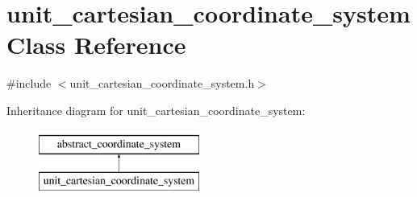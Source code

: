 \hypertarget{classunit__cartesian__coordinate__system}{\section{unit\-\_\-cartesian\-\_\-coordinate\-\_\-system Class Reference}
\label{classunit__cartesian__coordinate__system}
}


{\ttfamily \#include $<$unit\-\_\-cartesian\-\_\-coordinate\-\_\-system.\-h$>$}

Inheritance diagram for unit\-\_\-cartesian\-\_\-coordinate\-\_\-system\-:\begin{figure}[H]
\begin{center}
\leavevmode
\includegraphics[height=2.000000cm]{classunit__cartesian__coordinate__system}
\end{center}
\end{figure}
